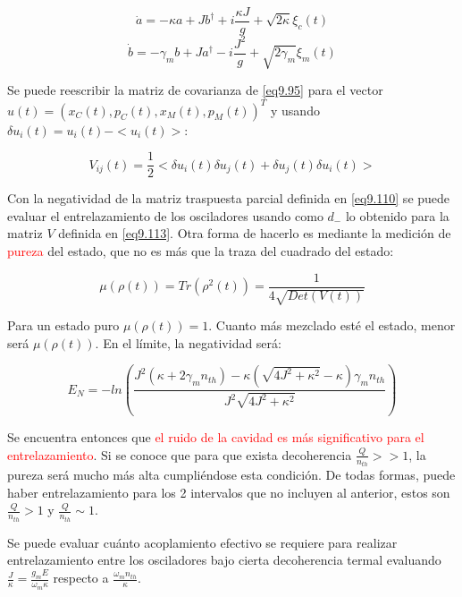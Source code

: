 \documentclass{book}
\begin{document}
\begin{equation}\label{eq9.111}\dot{a}=-\kappa a+Jb^\dag+i\frac{\kappa J}{g}+\sqrt{2\kappa}\xi_c(t)\end{equation}
\begin{equation}\label{eq9.112}\dot{b}=-\gamma_m b+Ja^\dag-i\frac{J^2}{g}+\sqrt{2\gamma_m}\xi_m(t)\end{equation}

Se puede reescribir la matriz de covarianza de \ref{eq9.95} para el vector $u(t)=(x_C(t),p_C(t),x_M(t),p_M(t))^T$ y usando $\delta u_i(t)=u_i(t)-<u_i(t)>$:

\begin{equation}\label{eq9.113}V_{ij}(t)=\frac{1}{2}<\delta u_i(t)\delta u_j(t)+\delta u_j(t)\delta u_i(t)>\end{equation}

Con la negatividad de la matriz traspuesta parcial definida en \ref{eq9.110} se puede evaluar el entrelazamiento de los osciladores usando como $d_-$ lo obtenido para la matriz $V$ definida en \ref{eq9.113}. Otra forma de hacerlo es mediante la medición de \textcolor{red}{pureza} del estado, que no es más que la traza del cuadrado del estado:

\begin{equation}\label{eq9.114}\mu(\rho(t))=Tr (\rho^2(t))=\frac{1}{4\sqrt{Det(V(t))}}\end{equation}

Para un estado puro $\mu(\rho(t))=1$. Cuanto más mezclado esté el estado, menor será $\mu(\rho(t))$. En el límite, la negatividad será:

\begin{equation}\label{eq9.115}E_N=-ln(\frac{J^2(\kappa+2\gamma_mn_{th})-\kappa(\sqrt{4J^2+\kappa^2}-\kappa)\gamma_mn_{th}}{J^2\sqrt{4J^2+\kappa^2}})\end{equation}

Se encuentra entonces que \textcolor{red}{el ruido de la cavidad es más significativo para el entrelazamiento}. Si se conoce que para que exista decoherencia $\frac{Q}{n_{th}}>>1$, la pureza será mucho más alta cumpliéndose esta condición. De todas formas, puede haber entrelazamiento para los 2 intervalos que no incluyen al anterior, estos son $\frac{Q}{n_{th}}>1$ y $\frac{Q}{n_{th}}\sim 1$. 

Se puede evaluar cuánto acoplamiento efectivo se requiere para realizar entrelazamiento entre los osciladores bajo cierta decoherencia termal evaluando $\frac{J}{\kappa}=\frac{g_mE}{\omega_m\kappa}$ respecto a $\frac{\omega_m n_{th}}{\kappa}$.
\end{document}
